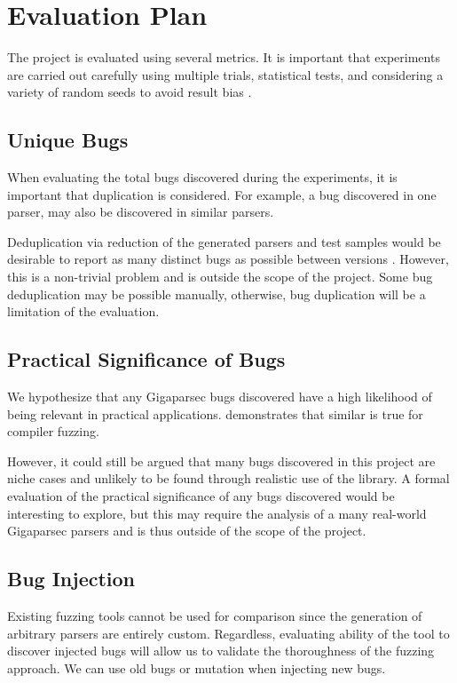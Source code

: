 \documentclass{article}
\let\oldciteauthor\citeauthor
\renewcommand{\citeauthor}[1]{\oldciteauthor{#1} \cite{#1}}
\begin{document}
\section{Evaluation Plan} %

The project is evaluated using several metrics. It is important that experiments are carried out carefully using multiple trials, statistical tests, and considering a variety of random seeds to avoid result bias \cite{evaluation}.

\subsection{Unique Bugs}

When evaluating the total bugs discovered during the experiments, it is important that duplication is considered. For example, a bug discovered in one parser, may also be discovered in similar parsers.

Deduplication via reduction of the generated parsers and test samples would be desirable to report as many distinct bugs as possible between versions \cite{deduplication}. However, this is a non-trivial problem and is outside the scope of the project. Some bug deduplication may be possible manually, otherwise, bug duplication will be a limitation of the evaluation.

\subsection{Practical Significance of Bugs}

We hypothesize that any Gigaparsec bugs discovered have a high likelihood of being relevant in practical applications. \citeauthor{fuzzing-importance} demonstrates that similar is true for compiler fuzzing.

However, it could still be argued that many bugs discovered in this project are niche cases and unlikely to be found through realistic use of the library. A formal evaluation of the practical significance of any bugs discovered would be interesting to explore, but this may require the analysis of a many real-world Gigaparsec parsers and is thus outside of the scope of the project.

\subsection{Bug Injection}

Existing fuzzing tools cannot be used for comparison since the generation of arbitrary parsers are entirely custom. Regardless, evaluating ability of the tool to discover injected bugs will allow us to validate the thoroughness of the fuzzing approach. We can use old bugs or mutation when injecting new bugs.
\end{document}
